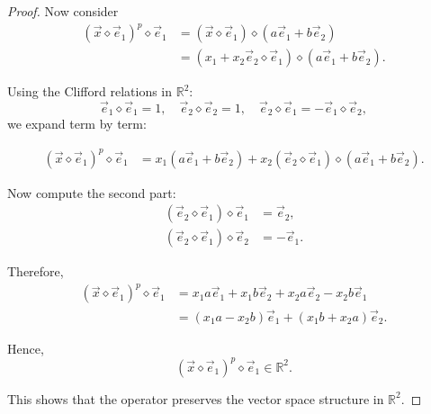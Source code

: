 \documentclass{amsart}
\theoremstyle{plain}
\numberwithin{equation}{section}
\begin{document}
\begin{proof}
Now consider
\begin{align*}
(\vec x \diamond \vec e_1)^p \diamond \vec e_1
&=
(\vec x \diamond \vec e_1)
\diamond
(a \vec e_1 + b \vec e_2) \\
&=
(x_1 + x_2 \vec e_2 \diamond \vec e_1)
\diamond
(a \vec e_1 + b \vec e_2).
\end{align*}

Using the Clifford relations in $\mathbb{R}^2$:
\[
\vec e_1 \diamond \vec e_1 = 1, 
\quad
\vec e_2 \diamond \vec e_2 = 1,
\quad
\vec e_2 \diamond \vec e_1 = - \vec e_1 \diamond \vec e_2,
\]
we expand term by term:

\begin{align*}
(\vec x \diamond \vec e_1)^p \diamond \vec e_1
&=
x_1(a \vec e_1 + b \vec e_2)
+ x_2 (\vec e_2 \diamond \vec e_1)
\diamond (a \vec e_1 + b \vec e_2).
\end{align*}

Now compute the second part:
\begin{align*}
(\vec e_2 \diamond \vec e_1)\diamond \vec e_1 &= \vec e_2,\\
(\vec e_2 \diamond \vec e_1)\diamond \vec e_2 &= -\vec e_1.
\end{align*}

Therefore,
\begin{align*}
(\vec x \diamond \vec e_1)^p \diamond \vec e_1
&=
x_1 a \vec e_1 + x_1 b \vec e_2
+ x_2 a \vec e_2 - x_2 b \vec e_1 \\
&=
(x_1 a - x_2 b)\vec e_1
+
(x_1 b + x_2 a)\vec e_2.
\end{align*}

Hence,
\[
(\vec x \diamond \vec e_1)^p \diamond \vec e_1 \in \mathbb{R}^2.
\]

This shows that the operator preserves the vector space structure in $\mathbb{R}^2$.

\end{proof}
\end{document}
